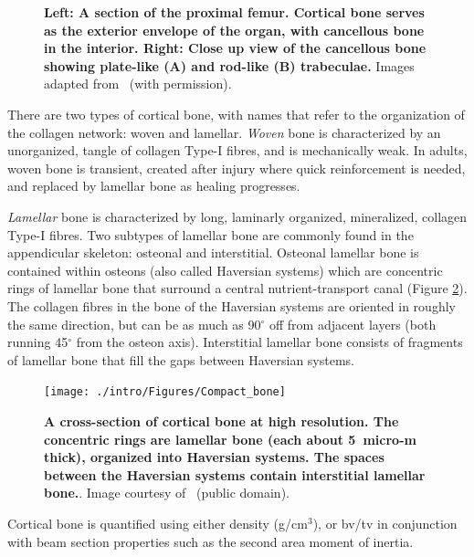 \begin{figure}
\begin{subfigure}{.49\linewidth}
\end{subfigure}
\caption[Cortical and cancellous bone images in the proximal femur]{\textbf{Left: A section of the proximal femur. Cortical bone serves as the exterior envelope of the organ, with cancellous bone in the interior. Right: Close up view of the cancellous bone showing plate-like (A) and rod-like (B) trabeculae.} Images adapted from~\citet{ascenzi_variation_2011} (with permission).}
\label{fig:bone_cancellous}
\end{figure}

There are two types of cortical bone, with names that refer to the organization of the collagen network: woven and lamellar.
\textit{Woven} bone is characterized by an unorganized, tangle of collagen Type-I fibres, and is mechanically weak.
In adults, woven bone is transient, created after injury where quick reinforcement is needed, and replaced by lamellar bone as healing progresses.

\textit{Lamellar} bone is characterized by long, laminarly organized, mineralized, collagen Type-I fibres.
Two subtypes of lamellar bone are commonly found in the appendicular skeleton: osteonal and interstitial.
Osteonal lamellar bone is contained within osteons (also called Haversian systems) which are concentric rings of lamellar bone that surround a central nutrient-transport canal (Figure \ref{fig:Compact_bone}).
The collagen fibres in the bone of the Haversian systems are oriented in roughly the same direction, but can be as much as 90$^\circ$ off from adjacent layers (both running 45$^\circ$ from the osteon axis).
Interstitial lamellar bone consists of fragments of lamellar bone that fill the gaps between Haversian systems.

\begin{figure}
\texttt{[image: ./intro/Figures/Compact\_bone]}			
\caption[Cortical bone cross-section]{\textbf{A cross-section of cortical bone at high resolution. The concentric rings are lamellar bone (each about 5~\ac{micro-m} thick), organized into Haversian systems. The spaces between the Haversian systems contain interstitial lamellar bone.}. Image courtesy of~\citet{konrad_compact_2009} (public domain).}
\label{fig:Compact_bone}
\end{figure}

Cortical bone is quantified using either density (\acs{g}/\acs{cm}$^3$), or \acf{bv/tv} in conjunction with beam section properties such as the second area moment of inertia.

